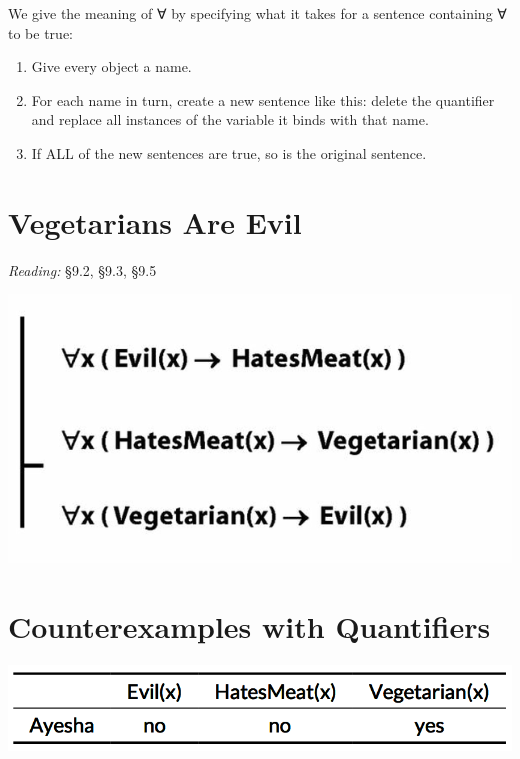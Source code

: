 \documentclass[12pt]{extarticle}
\begin{document}
\begin{multicols*}{3}
We give the meaning of ∀ by specifying what it takes for a sentence containing ∀ to be true:
 
\begin{enumerate}
 
\item Give every object a name.
 
\item For each name in turn, create a new sentence like this: delete the quantifier and replace all instances of the variable it binds with that name.
 
\item If ALL of the new sentences are true, so is the original sentence.
 
\end{enumerate}
 
 
 
\section{Vegetarians Are Evil}
 
\emph{Reading:} §9.2, §9.3, §9.5
 
\begin{center}
\includegraphics[scale=0.3]{img/vegetarians.png}
\end{center}
 
 
\section{Counterexamples with Quantifiers}
 
\begin{center}
\includegraphics[scale=0.3]{img/unit_502b_counterexample.png}
\end{center}
 

\end{multicols*}
\end{document}
